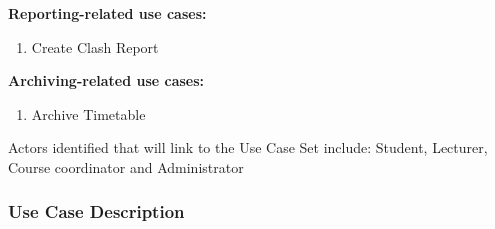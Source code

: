 \documentclass{article}
\begin{document}
\textbf{Reporting-related use cases:}
\begin{enumerate}
\item Create Clash Report
\end{enumerate}

\textbf{Archiving-related use cases:}
\begin{enumerate}
\item Archive Timetable
\end{enumerate}

Actors identified that will link to the Use Case Set include: Student, Lecturer, Course coordinator and Administrator


\subsubsection{Use Case Description}
\end{document}
